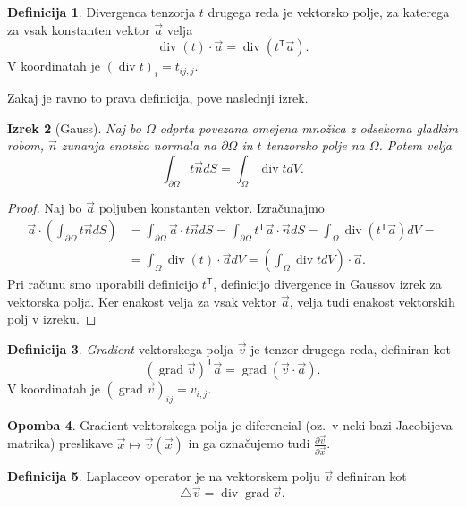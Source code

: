 \documentclass[12pt,a4paper,twoside]{article}
\theoremstyle{definition} %
\newtheorem{definicija}{Definicija}[section]
\newtheorem{opomba}[definicija]{Opomba}
\theoremstyle{plain} %
\newtheorem{izrek}[definicija]{Izrek}
\numberwithin{equation}{section}
\newcommand{\T}{\mathsf{T}}
\newcommand{\lap}{\triangle}
\renewcommand{\div}{\operatorname{div}}
\newcommand{\grad}{\operatorname{grad}}
\newcommand{\dpar}[2]{\ensuremath{\frac{\partial #1}{\partial #2}}}
\newcommand{\vv}{\vec{v}}
\newcommand{\va}{\vec{a}}
\newcommand{\vn}{\vec{n}}
\newcommand{\vx}{\vec{x}}
\begin{document}
\begin{definicija}
  Divergenca tenzorja $t$ drugega reda je vektorsko polje, za katerega za vsak
  konstanten vektor $\va$ velja
  \begin{equation}
    \div(t)\cdot \va = \div(t^\T \va).
  \end{equation}
  V koordinatah je $(\div t)_i = t_{ij,j}$.
\end{definicija}

Zakaj je ravno to prava definicija, pove naslednji izrek.
\begin{izrek}[Gauss]
  \label{izr:gauss}
  Naj bo $\Omega$ odprta povezana omejena množica z odsekoma gladkim robom, $\vn$ zunanja enotska
  normala na $\partial \Omega$ in $t$ tenzorsko polje na $\Omega$. Potem velja
  \begin{equation}
    \int_{\partial \Omega} t\vn dS = \int_{\Omega} \div t dV.
  \end{equation}
\end{izrek}
\begin{proof}
Naj bo $\va$ poljuben konstanten vektor. Izračunajmo
\begin{align*}
  \va \cdot \left( \int_{\partial \Omega} t\vn dS \right) &=
  \int_{\partial \Omega}\va \cdot t\vn dS =
  \int_{\partial \Omega}t^\T \va \cdot \vn dS =
  \int_{\Omega}\div(t^\T \va) dV = \\ &=
  \int_{\Omega}\div(t) \cdot \va dV =
  \left(\int_{\Omega}\div t dV\right) \cdot \va.
\end{align*}
Pri računu smo uporabili definicijo $t^\T$, definicijo divergence in Gaussov
izrek za vektorska polja. Ker enakost velja za vsak vektor $\va$, velja tudi
enakost vektorskih polj v izreku.
\end{proof}

\begin{definicija}
  \emph{Gradient} vektorskega polja $\vv$ je tenzor drugega reda, definiran kot
  \begin{equation}
    (\grad\vv)^\T \va = \grad(\vv\cdot\va).
  \end{equation}
  V koordinatah je $(\grad\vv)_{ij} = v_{i,j}$.
\end{definicija}
\begin{opomba}
  Gradient vektorskega polja je diferencial (oz.~v neki bazi Jacobijeva matrika)
  preslikave $\vx \mapsto \vv(\vx)$ in ga označujemo tudi $\dpar{\vv}{\vx}$.
\end{opomba}

\begin{definicija}
  Laplaceov operator je na vektorskem polju $\vv$ definiran kot
  \begin{equation}
    \lap \vv = \div\grad \vv.
  \end{equation}
\end{definicija}
\end{document}
